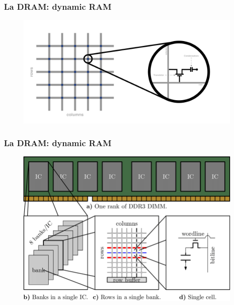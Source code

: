 \begin{frame}
	\frametitle{La DRAM: dynamic RAM}
	 
	\begin{figure}[!htbp] 
		\centering
		\includegraphics[width=1.0\linewidth]{images/5_memory/dram_matrix_3.pdf}
	\end{figure}
	
\end{frame}


\begin{frame}
	\frametitle{La DRAM: dynamic RAM}
	 
	
	\begin{figure}[!htbp] 
		\centering
		\includegraphics[width=0.8\linewidth]{images/5_memory/dram_organization.png}
		\label{fig:memory_dram_organization}
	\end{figure} 

\end{frame}


